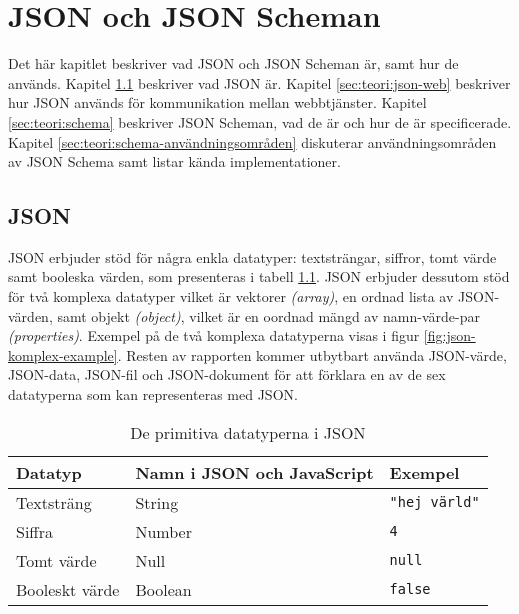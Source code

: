 \chapter{JSON och JSON Scheman}
\label{sec:teori}
Det här kapitlet beskriver vad JSON och JSON Scheman är, samt hur de används. Kapitel \ref{sec:teori:json} beskriver vad JSON är. Kapitel \ref{sec:teori:json-web} beskriver hur JSON används för kommunikation mellan webbtjänster. Kapitel \ref{sec:teori:schema} beskriver JSON Scheman, vad de är och hur de är specificerade. Kapitel \ref{sec:teori:schema-användningsområden} diskuterar användningsområden av JSON Schema samt listar kända implementationer.

\section{JSON}
\label{sec:teori:json}
JSON erbjuder stöd för några enkla datatyper: textsträngar, siffror, tomt värde samt booleska värden, som presenteras i tabell \ref{tab:json-primitives}. JSON erbjuder dessutom stöd för två komplexa datatyper vilket är vektorer \textit{(array)}, en ordnad lista av JSON-värden, samt objekt \textit{(object)}, vilket är en oordnad mängd av namn-värde-par \textit{(properties)}. Exempel på de två komplexa datatyperna visas i figur \ref{fig:json-komplex-example}. Resten av rapporten kommer utbytbart använda JSON-värde, JSON-data, JSON-fil och JSON-dokument för att förklara en av de sex datatyperna som kan representeras med JSON.

\begin{table}
	\centering
	\caption{De primitiva datatyperna i JSON}
	\label{tab:json-primitives}
	\begin{tabular}{ | l | l | l | }
		\hline
		Datatyp & Namn i JSON och JavaScript & Exempel \\
		\hline
		Textsträng & String & \texttt{"hej värld"} \\
		\hline
		Siffra & Number & \texttt{4} \\
		\hline
		Tomt värde & Null & \texttt{null} \\
		\hline
		Booleskt värde & Boolean & \texttt{false} \\
		\hline
	\end{tabular}
\end{table}

